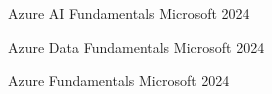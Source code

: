 
\begin{cvhonors}

  \cvhonor
    {Azure AI Fundamentals} %
    {Microsoft} %
    {} %
    {2024} %

  \cvhonor
    {Azure Data Fundamentals} %
    {Microsoft} %
    {} %
    {2024} %

  \cvhonor
    {Azure Fundamentals} %
    {Microsoft} %
    {} %
    {2024} %



\end{cvhonors}
